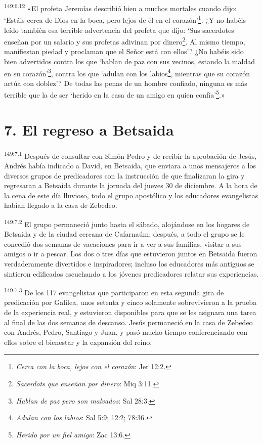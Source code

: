 \par 
\textsuperscript{149:6.12} «El profeta Jeremías describió bien a muchos mortales cuando dijo: `Estáis cerca de Dios en la boca, pero lejos de él en el corazón'\footnote{\textit{Cerca con la boca, lejos con el corazón}: Jer 12:2.}. ¿Y no habéis leído también esa terrible advertencia del profeta que dijo: `Sus sacerdotes enseñan por un salario y sus profetas adivinan por dinero\footnote{\textit{Sacerdots que enseñan por dinero}: Miq 3:11.}. Al mismo tiempo, manifiestan piedad y proclaman que el Señor está con ellos'? ¿No habéis sido bien advertidos contra los que `hablan de paz con sus vecinos, estando la maldad en su corazón'\footnote{\textit{Hablan de paz pero son malvados}: Sal 28:3.}, contra los que `adulan con los labios\footnote{\textit{Adulan con los labios}: Sal 5:9; 12:2; 78:36.}, mientras que su corazón actúa con doblez'? De todas las penas de un hombre confiado, ninguna es más terrible que la de ser `herido en la casa de un amigo en quien confía'\footnote{\textit{Herido por un fiel amigo}: Zac 13:6.}.»

\section*{7. El regreso a Betsaida}
\par 
\textsuperscript{149:7.1} Después de consultar con Simón Pedro y de recibir la aprobación de Jesús, Andrés había indicado a David, en Betsaida, que enviara a unos mensajeros a los diversos grupos de predicadores con la instrucción de que finalizaran la gira y regresaran a Betsaida durante la jornada del jueves 30 de diciembre. A la hora de la cena de este día lluvioso, todo el grupo apostólico y los educadores evangelistas habían llegado a la casa de Zebedeo.

\par 
\textsuperscript{149:7.2} El grupo permaneció junto hasta el sábado, alojándose en los hogares de Betsaida y de la ciudad cercana de Cafarnaúm; después, a todo el grupo se le concedió dos semanas de vacaciones para ir a ver a sus familias, visitar a sus amigos o ir a pescar. Los dos o tres días que estuvieron juntos en Betsaida fueron verdaderamente divertidos e inspiradores; incluso los educadores más antiguos se sintieron edificados escuchando a los jóvenes predicadores relatar sus experiencias.

\par 
\textsuperscript{149:7.3} De los 117 evangelistas que participaron en esta segunda gira de predicación por Galilea, unos setenta y cinco solamente sobrevivieron a la prueba de la experiencia real, y estuvieron disponibles para que se les asignara una tarea al final de las dos semanas de descanso. Jesús permaneció en la casa de Zebedeo con Andrés, Pedro, Santiago y Juan, y pasó mucho tiempo conferenciando con ellos sobre el bienestar y la expansión del reino.
